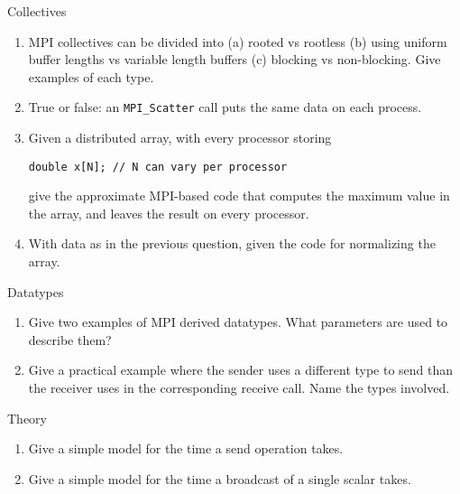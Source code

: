  {Collectives}

\begin{enumerate}

\item MPI collectives can be divided into (a) rooted vs rootless (b) using uniform
buffer lengths vs variable length buffers (c) blocking vs non-blocking. Give examples of
each type.  

\item True or false: an \lstinline{MPI_Scatter} call puts the same data on
  each process.

\item Given a distributed array, with every processor storing
\begin{lstlisting}
double x[N]; // N can vary per processor
\end{lstlisting}
give the approximate MPI-based code that computes the maximum value
in the array, and leaves the result on every processor.

\item With data as in the previous question, given the code for
normalizing the array.
\end{enumerate}

 {Datatypes}

\begin{enumerate}
\item Give two examples of MPI derived datatypes. What parameters are used
to describe them?

\item Give a practical example where the sender uses a different type to send
  than the receiver uses in the corresponding receive call. Name the types involved.

\end{enumerate}

 {Theory}

\begin{enumerate}

\item Give a simple model for the time a send operation takes.

\item Give a simple model for the time a broadcast of a single scalar takes.


\end{enumerate}

